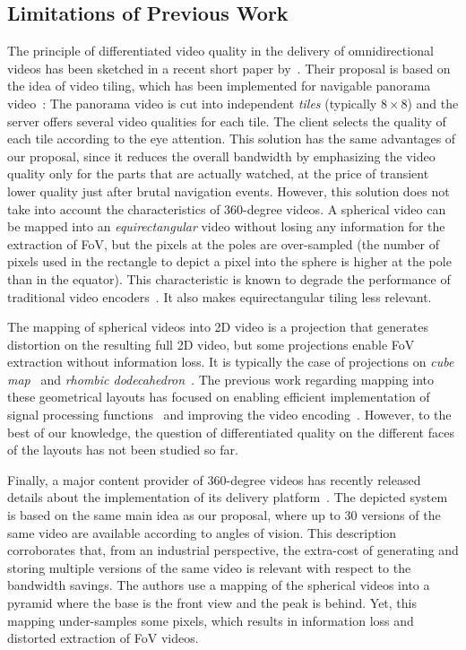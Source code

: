 \subsection{Limitations of Previous Work}

The principle of differentiated video quality in the delivery of omnidirectional videos has been sketched 
in a recent short paper by~\citet{ochi_live_2015}. Their proposal is based on the idea of video
tiling, which has been implemented for navigable panorama 
video~\cite{sanchez_compressed_2015,wang_mixing_2014,gaddam_tiling_2015}: The panorama video 
is cut into independent \emph{tiles} (typically $8\times 8$) and the server offers several
video qualities for each tile. The client selects the quality of each tile according to the eye attention. This
solution has the same advantages of our proposal, since it reduces the overall bandwidth by emphasizing
the video quality only for the parts that are actually watched, at the price of transient lower quality just after
brutal navigation events. However, this solution does not take into account the characteristics of 360-degree
videos. A spherical video can be mapped into an \emph{equirectangular} video without losing any information
for the extraction of \ac{FoV}, but the pixels at the poles are over-sampled (the number of pixels
used in the rectangle to depict a pixel into the sphere is higher at the pole than in the equator). 
This characteristic is known to degrade the
performance of traditional video encoders~\cite{wojciechowski_h.264_2006,yu_framework_2015}. It also 
makes equirectangular tiling less relevant.

The mapping of spherical videos into 2D video is a projection that generates distortion on the resulting
full 2D video, but some projections enable \ac{FoV} extraction without information loss. It is typically the case of 
projections on \emph{cube map}~\cite{Ng2005} and 
\emph{rhombic dodecahedron}~\cite{fu_rhombic_2009}. The previous work regarding mapping into these
geometrical layouts has focused on enabling efficient implementation of signal processing 
functions~\cite{kazhdan_metric-aware_2010} and improving the video encoding~\cite{tosic_low_2009}. 
However, to the best of our knowledge, the 
question of differentiated quality on the different faces of the layouts has not been studied so far.

Finally, a major content provider of 360-degree videos has recently released details about the 
implementation of its delivery platform~\cite{facebook}. The depicted system is based on the same
main idea as our proposal, where up to 30 versions of the same video are available according to angles
of vision. This description corroborates that, from an industrial perspective, the extra-cost of
generating and storing multiple versions of the same video is relevant with respect to the bandwidth
savings. The authors use a mapping of the spherical videos into a pyramid where the base is the front
view and the peak is behind. Yet, this mapping under-samples some pixels, which results in 
information loss and distorted extraction of \ac{FoV} videos.


